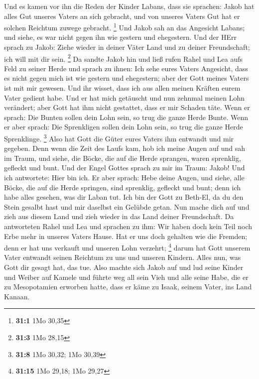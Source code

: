  Und es kamen vor ihn die Reden der Kinder Labans, dass sie
sprachen: Jakob hat alles Gut unseres Vaters an sich gebracht, und von
unseres Vaters Gut hat er solchen Reichtum zuwege gebracht. \footnote{\textbf{31:1}
  1Mo 30,35}  Und Jakob sah an das Angesicht Labans; und
siehe, es war nicht gegen ihn wie gestern und ehegestern. 
Und der HErr sprach zu Jakob: Ziehe wieder in deiner Väter Land und zu
deiner Freundschaft; ich will mit dir sein. \footnote{\textbf{31:3} 1Mo
  28,15}  Da sandte Jakob hin und ließ rufen Rahel und Lea
aufs Feld zu seiner Herde  und sprach zu ihnen: Ich sehe
eures Vaters Angesicht, dass es nicht gegen mich ist wie gestern und
ehegestern; aber der Gott meines Vaters ist mit mir gewesen.
 Und ihr wisset, dass ich aus allen meinen Kräften eurem
Vater gedient habe.  Und er hat mich getäuscht und nun
zehnmal meinen Lohn verändert; aber Gott hat ihm nicht gestattet, dass
er mir Schaden täte.  Wenn er sprach: Die Bunten sollen dein
Lohn sein, so trug die ganze Herde Bunte. Wenn er aber sprach: Die
Sprenkligen sollen dein Lohn sein, so trug die ganze Herde Sprenklinge.
\footnote{\textbf{31:8} 1Mo 30,32; 1Mo 30,39}  Also hat Gott
die Güter eures Vaters ihm entwandt und mir gegeben.  Denn
wenn die Zeit des Laufs kam, hob ich meine Augen auf und sah im Traum,
und siehe, die Böcke, die auf die Herde sprangen, waren sprenklig,
gefleckt und bunt.  Und der Engel Gottes sprach zu mir im
Traum: Jakob! Und ich antwortete: Hier bin ich.  Er aber
sprach: Hebe deine Augen, und siehe, alle Böcke, die auf die Herde
springen, sind sprenklig, gefleckt und bunt; denn ich habe alles
gesehen, was dir Laban tut.  Ich bin der Gott zu Beth-El,
da du den Stein gesalbt hast und mir daselbst ein Gelübde getan. Nun
mache dich auf und zieh aus diesem Land und zieh wieder in das Land
deiner Freundschaft.  Da antworteten Rahel und Lea und
sprachen zu ihm: Wir haben doch kein Teil noch Erbe mehr in unseres
Vaters Hause.  Hat er uns doch gehalten wie die Fremden;
denn er hat uns verkauft und unseren Lohn verzehrt; \footnote{\textbf{31:15}
  1Mo 29,18; 1Mo 29,27}  darum hat Gott unserem Vater
entwandt seinen Reichtum zu uns und unseren Kindern. Alles nun, was Gott
dir gesagt hat, das tue.  Also machte sich Jakob auf und
lud seine Kinder und Weiber auf Kamele  und führte weg all
sein Vieh und alle seine Habe, die er zu Mesopotamien erworben hatte,
dass er käme zu Isaak, seinem Vater, ins Land Kanaan. 
